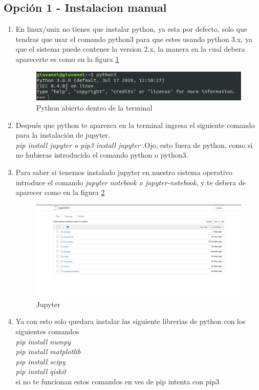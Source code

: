 \documentclass[12pt,letterpaper]{report}
\begin{document}
\subsection*{Opci\'on 1 - Instalacion manual}
\begin{enumerate}
    \item En linux/unix no tienes que instalar python, ya esta por defecto, solo que tendras que usar el comando python3 para que estes usando python 3.x, ya que el sistema puede contener la version 2.x, la manera en la cual debera aparecerte es como en la figura \ref{python-terminal2}
    \begin{figure}[H]
        \includegraphics[scale=0.7]{images/python-print.png}
        \caption{Python abierto dentro de la terminal}
        \label{python-terminal2}
    \end{figure}
    \item Despu\'es que python te aparezca en la terminal ingresa el siguiente comando para la instalaci\'on de jupyter.\\
    \textit{pip install jupyter o pip3 install jupyter} .Ojo, esto fuera de python, como si no hubieras introducido el comando python o python3.
    \item Para saber si tenemos instalado jupyter en nuestro sistema operativo introduce el comando \textit{jupyter notebook o jupyter-notebook}, y te debera de aparecer como en la figura \ref{jupyter-linux}
    \begin{figure}[H]
        \includegraphics[scale=0.3]{images/jupyter.png}
        \caption{Jupyter}
        \label{jupyter-linux}
    \end{figure}
    \item Ya con esto solo quedara instalar las siguiente librerias de python con los siguientes comandos\\
    \textit{pip install numpy\\
    pip install matplotlib\\
    pip install scipy\\
    pip install qiskit\\}
    si no te funcionan estos comandos en ves de pip intenta con pip3
\end{enumerate}
\end{document}
